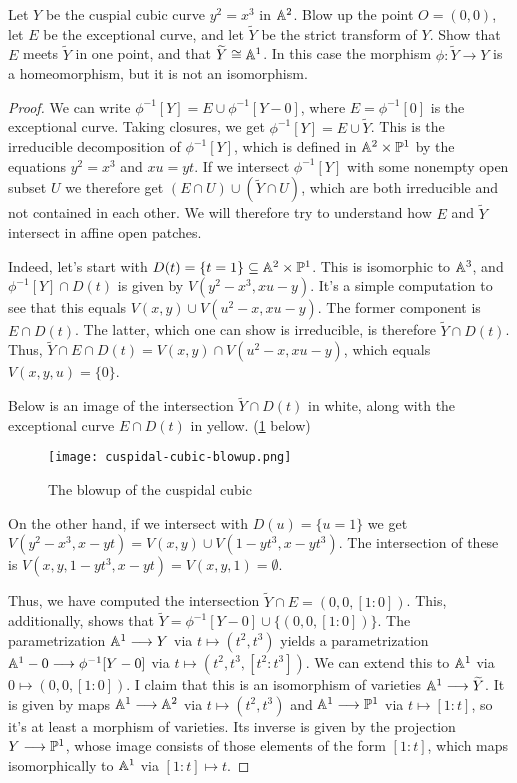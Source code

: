 \label{1.4.10}

Let $Y$ be the cuspial cubic curve $y^2 = x^3$ in $\A^2$. Blow up the point $O = (0, 0)$, let $E$ be the exceptional curve, and let $\widetilde{Y}$ be the strict transform of $Y$. Show that $E$ meets $\widetilde{Y}$ in one point, and that $\widetilde{Y} \cong \A^1$. In this case the morphism $\phi: \widetilde{Y} \longrightarrow Y$ is a homeomorphism, but it is not an isomorphism.

\begin{proof}
    We can write $\phi^{-1}[Y] = E \cup \phi^{-1}[Y - 0]$, where $E = \phi^{-1}[0]$ is the exceptional curve. Taking closures, we get $\phi^{-1}[Y] = E \cup \widetilde{Y}$. This is the irreducible decomposition of $\phi^{-1}[Y]$, which is defined in $\A^2 \times \P^1$ by the equations $y^2 = x^3$ and $xu = yt$. If we intersect $\phi^{-1}[Y]$ with some nonempty open subset $U$ we therefore get $(E \cap U) \cup (\widetilde{Y} \cap U)$, which are both irreducible and not contained in each other. We will therefore try to understand how $E$ and $\widetilde Y$ intersect in affine open patches.

    Indeed, let's start with $D(t) = \{t = 1\} \subseteq \A^2 \times \P^1$. This is isomorphic to $\A^3$, and $\phi^{-1}[Y] \cap D(t)$ is given by $V(y^2 - x^3, xu - y)$. It's a simple computation to see that this equals $V(x, y) \cup V(u^2 - x, xu - y)$. The former component is $E \cap D(t)$. The latter, which one can show is irreducible, is therefore $\widetilde Y \cap D(t)$. Thus, $\widetilde Y \cap E \cap D(t) = V(x, y) \cap V(u^2 - x, xu - y)$, which equals $V(x, y, u) = \{0\}$.

    Below is an image of the intersection $\widetilde{Y} \cap D(t)$ in white, along with the exceptional curve $E \cap D(t)$ in yellow. (\ref{fig1.4.1} below)
    \begin{figure}[h]
        \centering
        \texttt{[image: cuspidal-cubic-blowup.png]}
        \caption{The blowup of the cuspidal cubic}
        \label{fig1.4.1}
    \end{figure}


    On the other hand, if we intersect with $D(u) = \{u = 1\}$ we get $V(y^2 - x^3, x - yt) = V(x, y) \cup V(1 - yt^3, x - yt^3)$. The intersection of these is $V(x, y, 1 - yt^3, x - yt) = V(x, y, 1) = \emptyset$.

    Thus, we have computed the intersection $\widetilde Y \cap E = (0, 0, [1 : 0])$. This, additionally, shows that $\widetilde Y = \phi^{-1}[Y - 0] \cup \{(0, 0, [1 : 0])\}$. The parametrization $\A^1 \longrightarrow Y$ via $t \mapsto (t^2, t^3)$ yields a parametrization $\A^1 - 0 \longrightarrow \phi^{-1}[Y - 0]$ via $t \mapsto (t^2, t^3, [t^2 : t^3])$. We can extend this to $\A^1$ via $0 \mapsto (0, 0, [1 : 0])$. I claim that this is an isomorphism of varieties $\A^1 \longrightarrow \widetilde Y$. It is given by maps $\A^1 \longrightarrow \A^2$ via $t \mapsto (t^2, t^3)$ and $\A^1 \longrightarrow \P^1$ via $t \mapsto [1 : t]$, so it's at least a morphism of varieties. Its inverse is given by the projection $Y \longrightarrow \P^1$, whose image consists of those elements of the form $[1 : t]$, which maps isomorphically to $\A^1$ via $[1 : t] \mapsto t$.
    

\end{proof}

